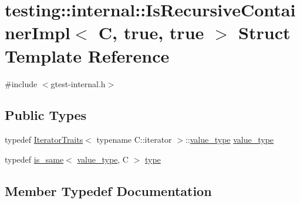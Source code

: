 \hypertarget{structtesting_1_1internal_1_1IsRecursiveContainerImpl_3_01C_00_01true_00_01true_01_4}{}\section{testing\+::internal\+::Is\+Recursive\+Container\+Impl$<$ C, true, true $>$ Struct Template Reference}
\label{structtesting_1_1internal_1_1IsRecursiveContainerImpl_3_01C_00_01true_00_01true_01_4}


{\ttfamily \#include $<$gtest-\/internal.\+h$>$}

\subsection*{Public Types}
\begin{DoxyCompactItemize}
\item 
typedef \mbox{\hyperlink{structtesting_1_1internal_1_1IteratorTraits}{Iterator\+Traits}}$<$ typename C\+::iterator $>$\+::\mbox{\hyperlink{structtesting_1_1internal_1_1IsRecursiveContainerImpl_3_01C_00_01true_00_01true_01_4_a8bbf5f5dec769e84b6f5a2e1fdb503e8}{value\+\_\+type}} \mbox{\hyperlink{structtesting_1_1internal_1_1IsRecursiveContainerImpl_3_01C_00_01true_00_01true_01_4_a8bbf5f5dec769e84b6f5a2e1fdb503e8}{value\+\_\+type}}
\item 
typedef \mbox{\hyperlink{structtesting_1_1internal_1_1is__same}{is\+\_\+same}}$<$ \mbox{\hyperlink{structtesting_1_1internal_1_1IsRecursiveContainerImpl_3_01C_00_01true_00_01true_01_4_a8bbf5f5dec769e84b6f5a2e1fdb503e8}{value\+\_\+type}}, C $>$ \mbox{\hyperlink{structtesting_1_1internal_1_1IsRecursiveContainerImpl_3_01C_00_01true_00_01true_01_4_a6bf4fa07dd1c22c5d0ca4ed99c546e9c}{type}}
\end{DoxyCompactItemize}


\subsection{Member Typedef Documentation}
\mbox{\label{structtesting_1_1internal_1_1IsRecursiveContainerImpl_3_01C_00_01true_00_01true_01_4_a6bf4fa07dd1c22c5d0ca4ed99c546e9c}} 
